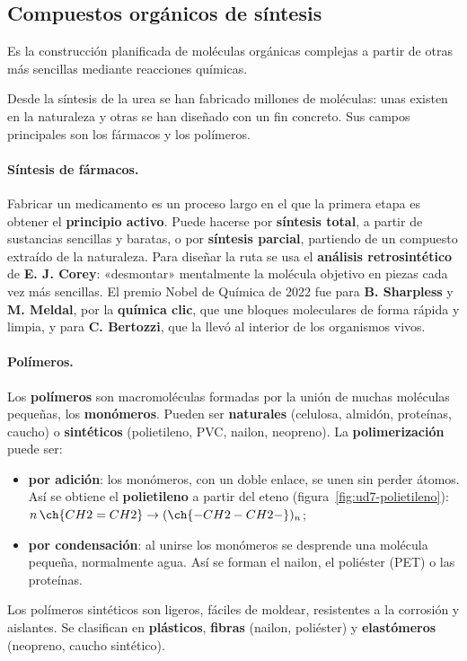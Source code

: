 \subsection{Compuestos orgánicos de síntesis}

\begin{definition}
    Es la construcción planificada de moléculas orgánicas complejas a partir de otras más sencillas mediante reacciones químicas.
\end{definition}

Desde la síntesis de la urea se han fabricado millones de moléculas: unas existen en la naturaleza y otras se han diseñado con un
fin concreto. Sus campos principales son los fármacos y los polímeros.

\paragraph{Síntesis de fármacos.} Fabricar un medicamento es un proceso largo en el que la primera etapa es obtener el
\textbf{principio activo}. Puede hacerse por \textbf{síntesis total}, a partir de sustancias sencillas y baratas, o por
\textbf{síntesis parcial}, partiendo de un compuesto extraído de la naturaleza. Para diseñar la ruta se usa el \textbf{análisis
retrosintético} de \textbf{E. J. Corey}: «desmontar» mentalmente la molécula objetivo en piezas cada vez más sencillas. El premio
Nobel de Química de 2022 fue para \textbf{B. Sharpless} y \textbf{M. Meldal}, por la \textbf{química clic}, que une bloques
moleculares de forma rápida y limpia, y para \textbf{C. Bertozzi}, que la llevó al interior de los organismos vivos.

\paragraph{Polímeros.} Los \textbf{polímeros} son macromoléculas formadas por la unión de muchas moléculas pequeñas, los
\textbf{monómeros}. Pueden ser \textbf{naturales} (celulosa, almidón, proteínas, caucho) o \textbf{sintéticos} (polietileno, PVC,
nailon, neopreno). La \textbf{polimerización} puede ser:
\begin{itemize}
    \item \textbf{por adición}: los monómeros, con un doble enlace, se unen sin perder átomos. Así se obtiene el
    \textbf{polietileno} a partir del eteno (figura~\ref{fig:ud7-polietileno}): \(n\,\ch{CH2=CH2} \rightarrow (\ch{-CH2-CH2-})_n\);
    \item \textbf{por condensación}: al unirse los monómeros se desprende una molécula pequeña, normalmente agua. Así se forman
    el nailon, el poliéster (PET) o las proteínas.
\end{itemize}
Los polímeros sintéticos son ligeros, fáciles de moldear, resistentes a la corrosión y aislantes. Se clasifican en
\textbf{plásticos}, \textbf{fibras} (nailon, poliéster) y \textbf{elastómeros} (neopreno, caucho sintético).

